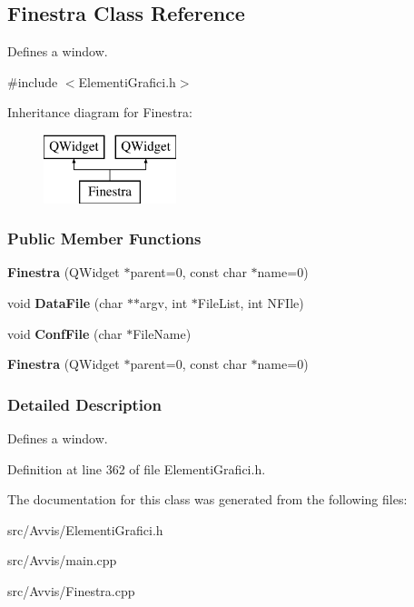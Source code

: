 \hypertarget{classFinestra}{}\subsection{Finestra Class Reference}
\label{classFinestra}


Defines a window.  




{\ttfamily \#include $<$Elementi\+Grafici.\+h$>$}

Inheritance diagram for Finestra\+:\begin{figure}[H]
\begin{center}
\leavevmode
\includegraphics[height=2.000000cm]{classFinestra}
\end{center}
\end{figure}
\subsubsection*{Public Member Functions}
\begin{DoxyCompactItemize}
\item 
{\bfseries Finestra} (Q\+Widget $\ast$parent=0, const char $\ast$name=0)\hypertarget{classFinestra_a8ec00c73de692c63ac3cc1ff48cf1150}{}\label{classFinestra_a8ec00c73de692c63ac3cc1ff48cf1150}

\item 
void {\bfseries Data\+File} (char $\ast$$\ast$argv, int $\ast$File\+List, int N\+F\+Ile)\hypertarget{classFinestra_a0350b9437e10e751a3e55be68ca552ff}{}\label{classFinestra_a0350b9437e10e751a3e55be68ca552ff}

\item 
void {\bfseries Conf\+File} (char $\ast$File\+Name)\hypertarget{classFinestra_a418fd69a796855fc20dcdaf6bb94fc68}{}\label{classFinestra_a418fd69a796855fc20dcdaf6bb94fc68}

\item 
{\bfseries Finestra} (Q\+Widget $\ast$parent=0, const char $\ast$name=0)\hypertarget{classFinestra_a8ec00c73de692c63ac3cc1ff48cf1150}{}\label{classFinestra_a8ec00c73de692c63ac3cc1ff48cf1150}

\end{DoxyCompactItemize}


\subsubsection{Detailed Description}
Defines a window. 

Definition at line 362 of file Elementi\+Grafici.\+h.



The documentation for this class was generated from the following files\+:\begin{DoxyCompactItemize}
\item 
src/\+Avvis/Elementi\+Grafici.\+h\item 
src/\+Avvis/main.\+cpp\item 
src/\+Avvis/Finestra.\+cpp\end{DoxyCompactItemize}
